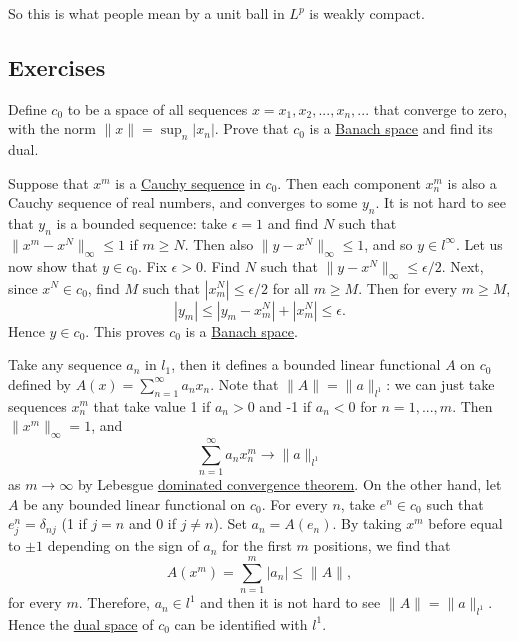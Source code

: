   So this is what people mean by a unit ball in $L^p$ is weakly compact. 

\subsection{Exercises} 

  \begin{exercise}
    Define $c_{0}$ to be a space of all sequences $x=x_{1},x_{2},...,x_{n},...$ that converge to zero, with the norm $\|x\|=\sup_{n}|x_{n}|$. Prove that $c_{0}$ is a \hyperref[mv-def:banach-space]{Banach space} and find its dual.
  \end{exercise}
  \begin{solution}
    Suppose that $x^{m}$ is a \hyperref[real-def:cauchy-sequence]{Cauchy sequence} in $c_{0}$. Then each component $x_{n}^{m}$ is also a Cauchy sequence of real numbers, and converges to some $y_{n}$. It is not hard to see that $y_{n}$ is a bounded sequence: take $\epsilon=1$ and find $N$ such that $\|x^{m}-x^{N}\|_{\infty}\le1$ if $m\ge N$. Then also $\|y-x^{N}\|_{\infty}\le1$, and so $y\in l^{\infty}$. Let us now show that $y\in c_{0}$. Fix $\epsilon>0$. Find $N$ such that $\|y-x^{N}\|_{\infty}\le\epsilon/2$. Next, since $x^{N}\in c_{0}$, find $M$ such that $|x_{m}^{N}|\le\epsilon/2$ for all $m\ge M$. Then for every $m\ge M$,
    \begin{equation}
      |y_{m}|\le|y_{m}-x_{m}^{N}|+|x_{m}^{N}|\le\epsilon.
    \end{equation}
    Hence $y\in c_{0}$. This proves $c_{0}$ is a \hyperref[mv-def:banach-space]{Banach space}.

    Take any sequence $a_{n}$ in $l_{1}$, then it defines a bounded linear functional $A$ on $c_{0}$ defined by $A(x)=\sum_{n=1}^{\infty}a_{n}x_{n}$. Note that $\|A\|=\|a\|_{l^{1}}$: we can just take sequences $x_{n}^{m}$ that take value 1 if $a_{n}>0$ and -1 if $a_{n}<0$ for $n=1,...,m$. Then $\|x^{m}\|_{\infty}=1$, and
    \begin{equation}
      \sum_{n=1}^{\infty}a_{n}x_{n}^{m}\rightarrow\|a\|_{l^{1}}
    \end{equation}
    as $m\rightarrow\infty$ by Lebesgue \hyperref[thm:dominated-convergence-theorem]{dominated convergence theorem}. On the other hand, let $A$ be any bounded linear functional on $c_{0}$. For every $n$, take $e^{n}\in c_{0}$ such that $e_{j}^{n}=\delta_{nj}$ (1 if $j=n$ and 0 if $j\ne n$). Set $a_{n}=A(e_{n})$. By taking $x^{m}$ before equal to $\pm1$ depending on the sign of $a_{n}$ for the first $m$ positions, we find that
    \begin{equation}
      A(x^{m})=\sum_{n=1}^{m}|a_{n}|\le\|A\|,
    \end{equation}
    for every $m$. Therefore, $a_{n}\in l^{1}$ and then it is not hard to see $\|A\|=\|a\|_{l^{1}}$. Hence the \hyperref[lin-def:dual-space]{dual space} of $c_{0}$ can be identified with $l^{1}$.
  \end{solution}

